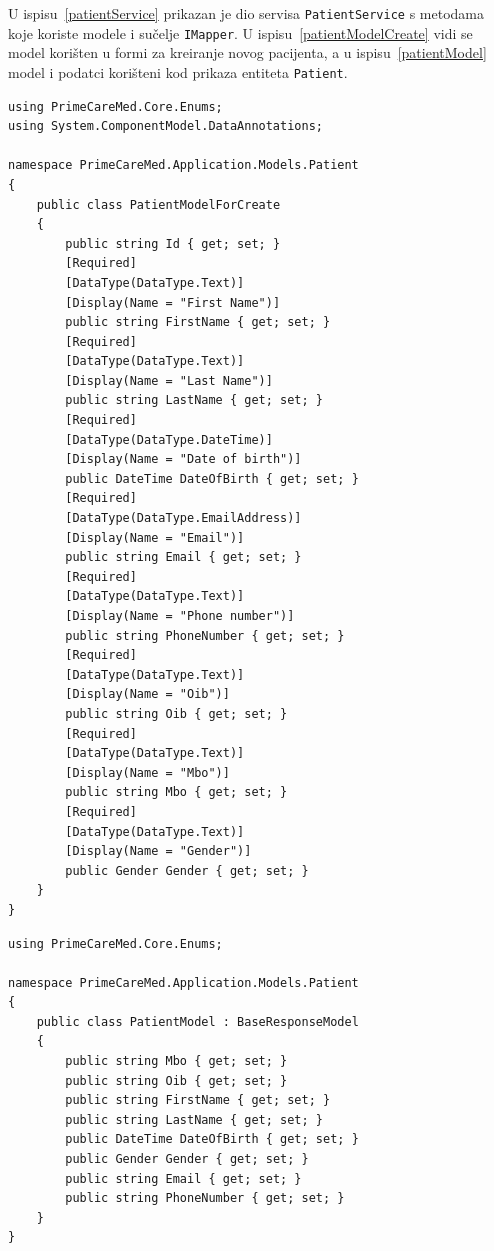 U ispisu~\ref{patientService} prikazan je dio servisa \texttt{PatientService} s metodama koje koriste modele i sučelje \texttt{IMapper}. U ispisu~\ref{patientModelCreate} vidi se model korišten u formi za kreiranje novog pacijenta, a u ispisu~\ref{patientModel} model i podatci korišteni kod prikaza entiteta \texttt{Patient}.
\begin{lstlisting}[caption={Model \texttt{PatientModelForCreate}}, label=patientModelCreate]
using PrimeCareMed.Core.Enums;
using System.ComponentModel.DataAnnotations;

namespace PrimeCareMed.Application.Models.Patient
{
    public class PatientModelForCreate
    {
        public string Id { get; set; }
        [Required]
        [DataType(DataType.Text)]
        [Display(Name = "First Name")]
        public string FirstName { get; set; }
        [Required]
        [DataType(DataType.Text)]
        [Display(Name = "Last Name")]
        public string LastName { get; set; }
        [Required]
        [DataType(DataType.DateTime)]
        [Display(Name = "Date of birth")]
        public DateTime DateOfBirth { get; set; }
        [Required]
        [DataType(DataType.EmailAddress)]
        [Display(Name = "Email")]
        public string Email { get; set; }
        [Required]
        [DataType(DataType.Text)]
        [Display(Name = "Phone number")]
        public string PhoneNumber { get; set; }
        [Required]
        [DataType(DataType.Text)]
        [Display(Name = "Oib")]
        public string Oib { get; set; }
        [Required]
        [DataType(DataType.Text)]
        [Display(Name = "Mbo")]
        public string Mbo { get; set; }
        [Required]
        [DataType(DataType.Text)]
        [Display(Name = "Gender")]
        public Gender Gender { get; set; }
    }
}
\end{lstlisting}

\begin{lstlisting}[caption={Model \texttt{PatientModel}}, label=patientModel]
using PrimeCareMed.Core.Enums;

namespace PrimeCareMed.Application.Models.Patient
{
    public class PatientModel : BaseResponseModel
    {
        public string Mbo { get; set; }
        public string Oib { get; set; }
        public string FirstName { get; set; }
        public string LastName { get; set; }
        public DateTime DateOfBirth { get; set; }
        public Gender Gender { get; set; }
        public string Email { get; set; }
        public string PhoneNumber { get; set; }
    }
}
\end{lstlisting}

